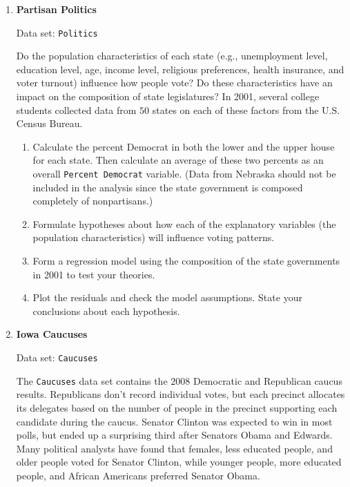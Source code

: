 \documentclass[
]{book}
\begin{document}
\begin{enumerate}
The \texttt{AIDS} data set shows the prevalence of HIV/AIDS in adults aged $15$ to $49$ in least developed countries along with country-level data on several socioeconomic factors. Use this data set to create a multivariate regression model to predict the prevalence of HIV/AIDS from socioeconomic factors.

  \item \textbf{Partisan Politics}

Data set: \texttt{Politics}

Do the population characteristics of each state (e.g., unemployment level, education level, age, income level, religious preferences, health insurance, and voter turnout) influence how people vote? Do these characteristics have an impact on the composition of state legislatures? In 2001, several college students collected data from $50$ states on each of these factors from the U.S. Census Bureau.

  \begin{enumerate}
      \item Calculate the percent Democrat in both the lower and the upper house for each state. Then calculate an average of these two percents as an overall \texttt{Percent Democrat} variable. (Data from Nebraska should not be included in the analysis since the state government is composed completely of nonpartisans.)
      \item Formulate hypotheses about how each of the explanatory variables (the population characteristics) will influence voting patterns.
      \item Form a regression model using the composition of the state governments in 2001 to test your theories.
      \item Plot the residuals and check the model assumptions. State your conclusions about each hypothesis.
    \end{enumerate}

  \item \textbf{Iowa Caucuses}

Data set: \texttt{Caucuses}

The \texttt{Caucuses} data set contains the $2008$ Democratic and Republican caucus results. Republicans don’t record individual votes, but each precinct allocates its delegates based on the number of people in the precinct supporting each candidate during the caucus. Senator Clinton was expected to win in most polls, but ended up a surprising third after Senators Obama and Edwards. Many political analysts have found that females, less educated people, and older people voted for Senator Clinton, while younger people, more educated people, and African Americans preferred Senator Obama.


\end{enumerate}
\end{document}
